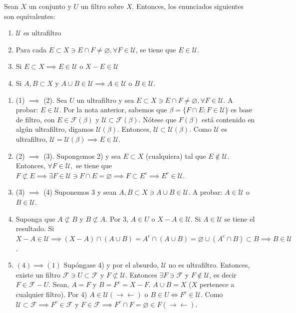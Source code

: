  \begin{teorema}
    Sean $X$ un conjunto y $U$ un filtro sobre $X$. Entonces, los enunciados siguientes son equivalentes: 
    \begin{enumerate}
        \item $\mathcal{U}$ es ultrafiltro
        \item Para cada $E\subset X\ni E\cap F\neq \varnothing,\forall F\in \mathcal{U}$, se tiene que $E\in \mathcal{U}$.
        \item Si $E\subset X\implies E\in \mathcal{U}$ o $ X-E\in \mathcal{U}$
        \item Si $A,B\subset X$ y $A\cup B \in \mathcal{U}\implies A\in \mathcal{U}$ o $B\in \mathcal{U}$. 
    \end{enumerate}
    \begin{dem}
        \begin{enumerate}
            \item (1) $\implies$ (2). Sea $U$ un ultrafiltro y sea $E\subset X\ni E\cap F\neq \varnothing,\forall F\in \mathcal{U}$. A probar: $E\in \mathcal{U}$. Por la nota anterior, sabemos que $\beta=\{F\cap E:F\in \mathcal{U}\}$ es base de filtro, con $E\in \mathcal{F}(\beta)$ y $\mathcal{U}\subset \mathcal{F}(\beta)$. Nótese que $F(\beta)$ está contenido en algún ultrafiltro, digamos $\mathcal{U}(\beta)$. Entonces, $\mathcal{U}\subset \mathcal{U}(\beta)$. Como $\mathcal{U}$ es ultrafiltro, $\mathcal{U}=\mathcal{U}(\beta)\implies E\in \mathcal{U}$. 
            \item (2) $\implies$ (3). Supongemos 2) y sea $E\subset X$ (cualquiera) tal que $E\not\in \mathcal{U}$. Entonces, $\forall F\in \mathcal{U},$ se tiene que $F\not\subset E\implies \exists F\in \mathcal{U}\ni F\cap E=\varnothing\implies F\subset E^c\implies E^c\in \mathcal{U}$.
            \item (3) $\implies$ (4) Suponemos 3 y sean $A,B\subset X\ni A\cup B \in \mathcal{U}$. A probar: $A\in \mathcal{U}$ o $B\in \mathcal{U}$.
            \item Suponga que $A\not\subset B$ y $B\not \subset A$. Por 3, $A\in U$ o $X-A\in \mathcal{U}$. Si $A\in \mathcal{U}$ se tiene el resultado. Si $X-A\in \mathcal{U}\implies (X-A)\cap (A\cup B)=A^c\cap (A\cup B)=\varnothing\cup (A^c\cap B)\subset B\implies B\in\mathcal{U}$.
            \item $(4)\implies (1)$ Supóngase 4) y por el absurdo, $\mathcal{U}$ no es ultrafiltro. Entonces, existe un filtro $\mathcal{F}\ni U\subset \mathcal{F}$ y $F\not\subset \mathcal{U}$. Entonces $\exists F\ni \mathcal{F}$ y $F\not\in \mathcal{U}$, es decir $F\in \mathcal{F}-U$. Sean, $A=F$ y $B=F^c=X-F$. $A\cup B=X$ ($X$ pertenece a cualquier filtro). Por 4) $A\in \mathcal{U}(\to \gets)$ o $B\in U\iff F^c\in \mathcal{U}$. Como $\mathcal{U}\subset \mathcal{F}\implies F^c\in \mathcal{F}$ y $F\in \mathcal{F}\implies F^c\cap F=\varnothing\in F(\to \gets)$.
        \end{enumerate}
        
    \end{dem}
\end{teorema}

